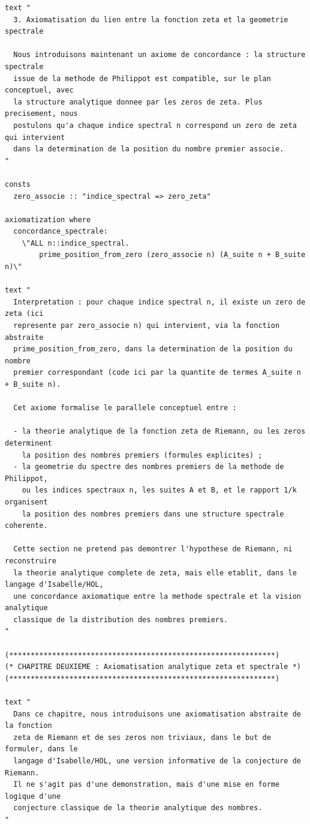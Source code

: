 \documentclass[a4paper,11pt]{article}
\begin{document}
\begin{holcode}[title={\textcolor{white}{Fichier : methode\_spectral.thy -- Partie 6/6 (FIN)}}]
\begin{lstlisting}
text "
  3. Axiomatisation du lien entre la fonction zeta et la geometrie spectrale

  Nous introduisons maintenant un axiome de concordance : la structure spectrale
  issue de la methode de Philippot est compatible, sur le plan conceptuel, avec
  la structure analytique donnee par les zeros de zeta. Plus precisement, nous
  postulons qu'a chaque indice spectral n correspond un zero de zeta qui intervient
  dans la determination de la position du nombre premier associe.
"

consts
  zero_associe :: "indice_spectral => zero_zeta"

axiomatization where
  concordance_spectrale:
    \"ALL n::indice_spectral.
        prime_position_from_zero (zero_associe n) (A_suite n + B_suite n)\"

text "
  Interpretation : pour chaque indice spectral n, il existe un zero de zeta (ici
  represente par zero_associe n) qui intervient, via la fonction abstraite
  prime_position_from_zero, dans la determination de la position du nombre
  premier correspondant (code ici par la quantite de termes A_suite n + B_suite n).

  Cet axiome formalise le parallele conceptuel entre :

  - la theorie analytique de la fonction zeta de Riemann, ou les zeros determinent
    la position des nombres premiers (formules explicites) ;
  - la geometrie du spectre des nombres premiers de la methode de Philippot,
    ou les indices spectraux n, les suites A et B, et le rapport 1/k organisent
    la position des nombres premiers dans une structure spectrale coherente.

  Cette section ne pretend pas demontrer l'hypothese de Riemann, ni reconstruire
  la theorie analytique complete de zeta, mais elle etablit, dans le langage d'Isabelle/HOL,
  une concordance axiomatique entre la methode spectrale et la vision analytique
  classique de la distribution des nombres premiers.
"

(**************************************************************)
(* CHAPITRE DEUXIEME : Axiomatisation analytique zeta et spectrale *)
(**************************************************************)

text "
  Dans ce chapitre, nous introduisons une axiomatisation abstraite de la fonction
  zeta de Riemann et de ses zeros non triviaux, dans le but de formuler, dans le
  langage d'Isabelle/HOL, une version informative de la conjecture de Riemann.
  Il ne s'agit pas d'une demonstration, mais d'une mise en forme logique d'une
  conjecture classique de la theorie analytique des nombres.
"


\end{lstlisting}
\end{holcode}
\end{document}
